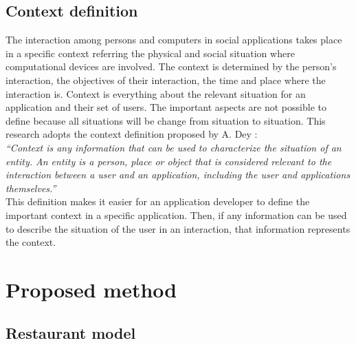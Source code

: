 \subsection{Context definition} \label{sec:2.1}  

The interaction among persons and computers in social applications takes place
in a specific context referring the physical and social situation where
computational devices are involved. The context is determined by the person’s
interaction, the objectives of their interaction, the time and place where the
interaction is. Context is everything about the relevant situation for an
application and their set of users. The important aspects are not possible to
define because all situations will be change from situation to situation. This
research adopts the context definition proposed by A. Dey
\cite{dey2001understanding}:\\ \textit{``Context is any information that can be
used to characterize the situation of an entity. An entity is a person, place or
object that is considered relevant to the interaction between a user and an
application, including the user and applications themselves.''}\\ This
definition makes it easier for an application developer to define the important
context in a specific application. Then, if any information can be used to
describe the situation of the user in an interaction, that information
represents the context.

\section{Proposed method}\label{sec:3}
\subsection{Restaurant model} \label{sec:3.1}

